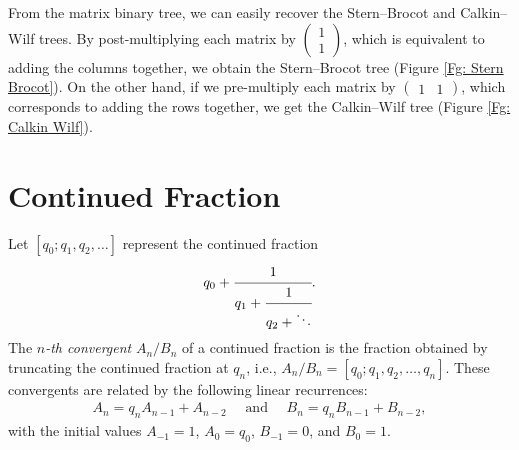 \documentclass[12pt]{article}
\theoremstyle{plain}
\theoremstyle{definition}
\theoremstyle{remark}
\begin{document}
From the matrix binary tree, we can easily recover the Stern--Brocot and Calkin--Wilf trees. By post-multiplying each matrix by $ \begin{pmatrix} 1 \\ 1 \end{pmatrix} $, which is equivalent to adding the columns together, we obtain the Stern--Brocot tree (Figure \ref{Fg: Stern Brocot}). On the other hand, if we pre-multiply each matrix by $ \begin{pmatrix} 1 & 1 \end{pmatrix} $, which corresponds to adding the rows together, we get the Calkin--Wilf tree (Figure \ref{Fg: Calkin Wilf}).

\section{Continued Fraction} \label{Ch: Continued Fraction}

Let $ [q_0; q_1, q_2, \ldots] $ represent the continued fraction
\begin{align*}
	q_0 + \cfrac{1}{q_1 + \cfrac{1}{q_2 + \ddots}}.
\end{align*}
The \textit{$ n $-th convergent} $ A_n/B_n $ of a continued fraction is the fraction obtained by truncating the continued fraction at $ q_n $, i.e., $ A_n/B_n = [q_0; q_1, q_2, \ldots, q_n] $. These convergents are related by the following linear recurrences:
\begin{align*}
	A_n = q_n A_{n - 1} + A_{n - 2} \quad \text{ and } \quad B_n = q_n B_{n - 1} + B_{n - 2},
\end{align*}
with the initial values $ A_{-1} = 1 $, $ A_0 = q_0 $, $ B_{-1} = 0 $, and $ B_0 = 1 $.
\end{document}

